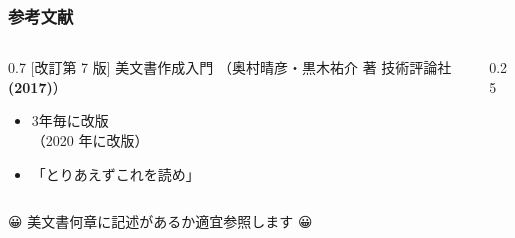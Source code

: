 \begin{frame}
	\frametitle{参考文献}
	\begin{columns}[c]
		\begin{column}{0.7\textwidth}
			[改訂第 7 版] \LaTeXe 美文書作成入門
			{\small （奥村晴彦・黒木祐介 著 技術評論社\textbf{(2017)}）}
			
			\begin{itemize}
				\item 3年毎に改版\\（2020 年に改版）
				\item 「とりあえずこれを読め」
			\end{itemize}
		\end{column}
		\begin{column}{0.25\textwidth}
		\end{column}
	\end{columns}
	{\nishikifont 😀 美文書何章に記述があるか適宜参照します 😀}
\end{frame}


